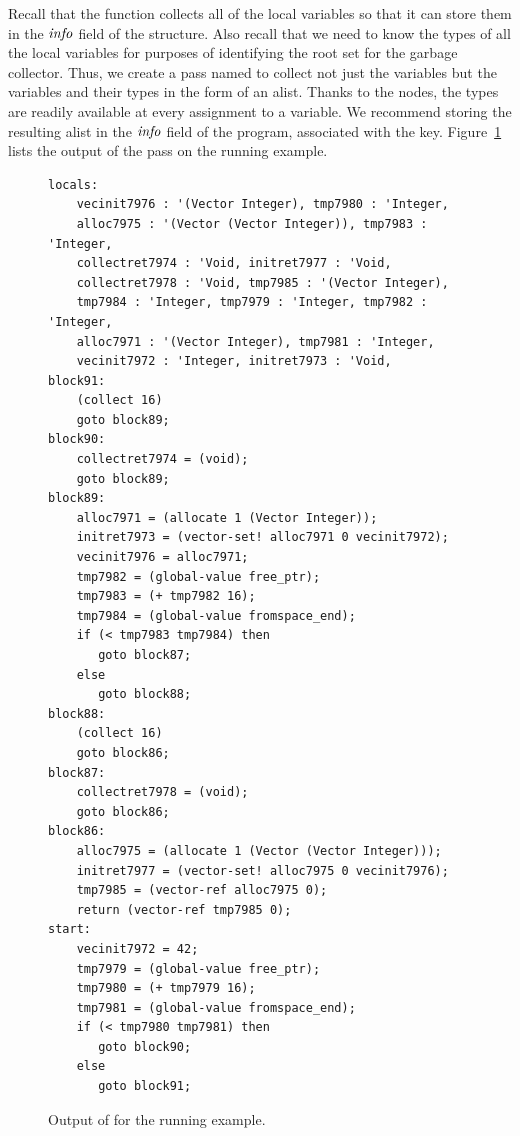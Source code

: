 \documentclass[11pt]{book}
\begin{document}
Recall that the  function collects all of the
local variables so that it can store them in the $\mathit{info}$ field of
the  structure. Also recall that we need to know the
types of all the local variables for purposes of identifying the root
set for the garbage collector.  Thus, we create a pass named
 to collect not just the variables but the
variables and their types in the form of an alist. Thanks to the
 nodes, the types are readily available at every
assignment to a variable. We recommend storing the resulting alist in
the $\mathit{info}$ field of the program, associated with the
 key. Figure~\ref{fig:uncover-locals-r3} lists the output
of the  pass on the running example.

\begin{figure}[tbp]
\begin{lstlisting}
locals:
    vecinit7976 : '(Vector Integer), tmp7980 : 'Integer,
    alloc7975 : '(Vector (Vector Integer)), tmp7983 : 'Integer,
    collectret7974 : 'Void, initret7977 : 'Void,
    collectret7978 : 'Void, tmp7985 : '(Vector Integer),
    tmp7984 : 'Integer, tmp7979 : 'Integer, tmp7982 : 'Integer,
    alloc7971 : '(Vector Integer), tmp7981 : 'Integer,
    vecinit7972 : 'Integer, initret7973 : 'Void, 
block91:
    (collect 16)
    goto block89;
block90:
    collectret7974 = (void);
    goto block89;
block89:
    alloc7971 = (allocate 1 (Vector Integer));
    initret7973 = (vector-set! alloc7971 0 vecinit7972);
    vecinit7976 = alloc7971;
    tmp7982 = (global-value free_ptr);
    tmp7983 = (+ tmp7982 16);
    tmp7984 = (global-value fromspace_end);
    if (< tmp7983 tmp7984) then
       goto block87;
    else
       goto block88;
block88:
    (collect 16)
    goto block86;
block87:
    collectret7978 = (void);
    goto block86;
block86:
    alloc7975 = (allocate 1 (Vector (Vector Integer)));
    initret7977 = (vector-set! alloc7975 0 vecinit7976);
    tmp7985 = (vector-ref alloc7975 0);
    return (vector-ref tmp7985 0);
start:
    vecinit7972 = 42;
    tmp7979 = (global-value free_ptr);
    tmp7980 = (+ tmp7979 16);
    tmp7981 = (global-value fromspace_end);
    if (< tmp7980 tmp7981) then
       goto block90;
    else
       goto block91;
\end{lstlisting}
\caption{Output of  for the running example.}
\label{fig:uncover-locals-r3}
\end{figure}

\clearpage
\end{document}
